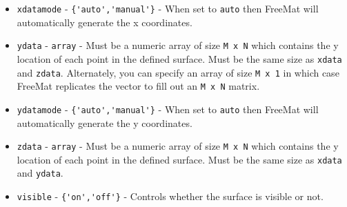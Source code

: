 \begin{itemize}
\item  \verb|xdatamode| - \verb|{'auto','manual'}| - When set to \verb|auto| then FreeMat will
 automatically generate the x coordinates.

\item  \verb|ydata| - \verb|array| - Must be a numeric array of size \verb|M x N| which contains
 the y location of each point in the defined surface. Must be the same size as \verb|xdata|
 and \verb|zdata|.   Alternately, you can specify an array of size \verb|M x 1| in which case
 FreeMat replicates the vector to fill out an \verb|M x N| matrix.

\item  \verb|ydatamode| - \verb|{'auto','manual'}| - When set to \verb|auto| then FreeMat will
 automatically generate the y coordinates.

\item  \verb|zdata| - \verb|array| - Must be a numeric array of size \verb|M x N| which contains
 the y location of each point in the defined surface. Must be the same size as \verb|xdata|
 and \verb|ydata|.

\item  \verb|visible| - \verb|{'on','off'}| - Controls whether the surface is
 visible or not.

\end{itemize}
